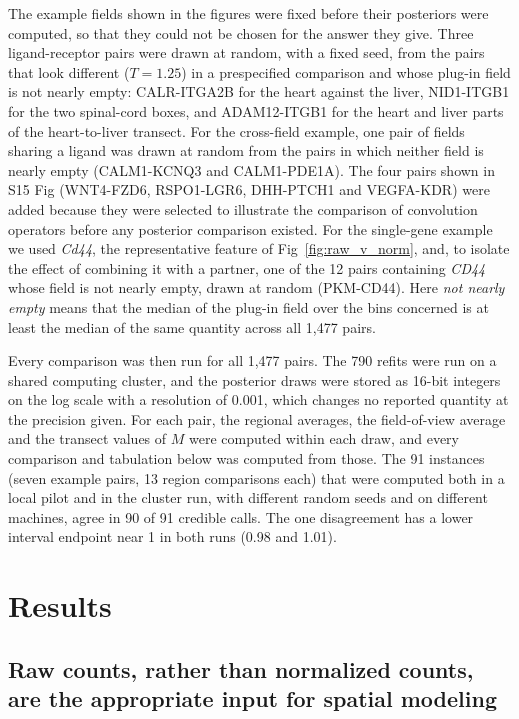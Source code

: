 \documentclass[10pt,letterpaper]{article}
\begin{document}
The example fields shown in the figures were fixed before their posteriors were computed, so that they could not be chosen for the answer they give. Three ligand-receptor pairs were drawn at random, with a fixed seed, from the pairs that look different ($T = 1.25$) in a prespecified comparison and whose plug-in field is not nearly empty: CALR-ITGA2B for the heart against the liver, NID1-ITGB1 for the two spinal-cord boxes, and ADAM12-ITGB1 for the heart and liver parts of the heart-to-liver transect. For the cross-field example, one pair of fields sharing a ligand was drawn at random from the pairs in which neither field is nearly empty (CALM1-KCNQ3 and CALM1-PDE1A). The four pairs shown in S15 Fig (WNT4-FZD6, RSPO1-LGR6, DHH-PTCH1 and VEGFA-KDR) were added because they were selected to illustrate the comparison of convolution operators before any posterior comparison existed. For the single-gene example we used \textit{Cd44}, the representative feature of Fig~\ref{fig:raw_v_norm}, and, to isolate the effect of combining it with a partner, one of the 12 pairs containing \textit{CD44} whose field is not nearly empty, drawn at random (PKM-CD44). Here \textit{not nearly empty} means that the median of the plug-in field over the bins concerned is at least the median of the same quantity across all 1,477 pairs.

Every comparison was then run for all 1,477 pairs. The 790 refits were run on a shared computing cluster, and the posterior draws were stored as 16-bit integers on the log scale with a resolution of 0.001, which changes no reported quantity at the precision given. For each pair, the regional averages, the field-of-view average and the transect values of $M$ were computed within each draw, and every comparison and tabulation below was computed from those. The 91 instances (seven example pairs, 13 region comparisons each) that were computed both in a local pilot and in the cluster run, with different random seeds and on different machines, agree in 90 of 91 credible calls. The one disagreement has a lower interval endpoint near 1 in both runs (0.98 and 1.01).

\section*{Results}

\subsection*{Raw counts, rather than normalized counts, are the appropriate input for spatial modeling}
\end{document}
